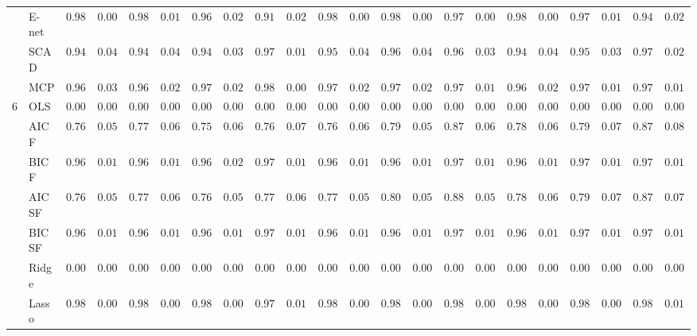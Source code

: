\begin{tabular}{ll|ll|llllll|llllll|llllll}
 & E-net  & $0.9878$ & $0.0071$ & $0.9829$ & $0.0149$ & $0.9617$ & $0.0293$ & $0.9177$ & $0.0281$ & $0.9884$ & $0.0076$ & $0.9877$ & $0.0050$ & $0.9766$ & $0.0098$ & $0.9856$ & $0.0094$ & $0.9749$ & $0.0154$ & $0.9492$ & $0.0205$ \\
 & SCAD  & $0.9455$ & $0.0481$ & $0.9402$ & $0.0418$ & $0.9475$ & $0.0313$ & $0.9767$ & $0.0192$ & $0.9547$ & $0.0425$ & $0.9613$ & $0.0403$ & $0.9668$ & $0.0300$ & $0.9435$ & $0.0407$ & $0.9503$ & $0.0306$ & $0.9749$ & $0.0210$ \\
 & MCP  & $0.9679$ & $0.0357$ & $0.9633$ & $0.0278$ & $0.9722$ & $0.0228$ & $0.9824$ & $0.0095$ & $0.9725$ & $0.0268$ & $0.9781$ & $0.0253$ & $0.9746$ & $0.0193$ & $0.9651$ & $0.0286$ & $0.9745$ & $0.0183$ & $0.9786$ & $0.0138$ \\\hline
6 & OLS  & $0.0000$ & $0.0000$ & $0.0000$ & $0.0000$ & $0.0000$ & $0.0000$ & $0.0000$ & $0.0000$ & $0.0000$ & $0.0000$ & $0.0000$ & $0.0000$ & $0.0000$ & $0.0000$ & $0.0000$ & $0.0000$ & $0.0000$ & $0.0000$ & $0.0000$ & $0.0000$ \\
 & AIC F  & $0.7606$ & $0.0585$ & $0.7713$ & $0.0672$ & $0.7565$ & $0.0677$ & $0.7659$ & $0.0712$ & $0.7684$ & $0.0662$ & $0.7958$ & $0.0599$ & $0.8738$ & $0.0608$ & $0.7815$ & $0.0692$ & $0.7931$ & $0.0754$ & $0.8723$ & $0.0852$ \\
 & BIC F  & $0.9626$ & $0.0178$ & $0.9681$ & $0.0159$ & $0.9681$ & $0.0202$ & $0.9717$ & $0.0124$ & $0.9607$ & $0.0198$ & $0.9661$ & $0.0188$ & $0.9774$ & $0.0122$ & $0.9655$ & $0.0166$ & $0.9705$ & $0.0146$ & $0.9774$ & $0.0132$ \\
 & AIC SF  & $0.7664$ & $0.0560$ & $0.7766$ & $0.0646$ & $0.7674$ & $0.0590$ & $0.7749$ & $0.0690$ & $0.7777$ & $0.0581$ & $0.8015$ & $0.0570$ & $0.8805$ & $0.0557$ & $0.7877$ & $0.0629$ & $0.7997$ & $0.0707$ & $0.8774$ & $0.0763$ \\
 & BIC SF  & $0.9626$ & $0.0178$ & $0.9682$ & $0.0157$ & $0.9683$ & $0.0199$ & $0.9717$ & $0.0124$ & $0.9608$ & $0.0196$ & $0.9662$ & $0.0185$ & $0.9774$ & $0.0122$ & $0.9655$ & $0.0166$ & $0.9708$ & $0.0138$ & $0.9775$ & $0.0130$ \\
 & Ridge  & $0.0000$ & $0.0000$ & $0.0000$ & $0.0000$ & $0.0000$ & $0.0000$ & $0.0000$ & $0.0000$ & $0.0000$ & $0.0000$ & $0.0000$ & $0.0000$ & $0.0000$ & $0.0000$ & $0.0000$ & $0.0000$ & $0.0000$ & $0.0000$ & $0.0000$ & $0.0000$ \\
 & Lasso  & $0.9893$ & $0.0021$ & $0.9895$ & $0.0000$ & $0.9868$ & $0.0080$ & $0.9789$ & $0.0158$ & $0.9895$ & $0.0000$ & $0.9888$ & $0.0044$ & $0.9874$ & $0.0050$ & $0.9892$ & $0.0023$ & $0.9885$ & $0.0034$ & $0.9847$ & $0.0101$ \\

\end{tabular}
